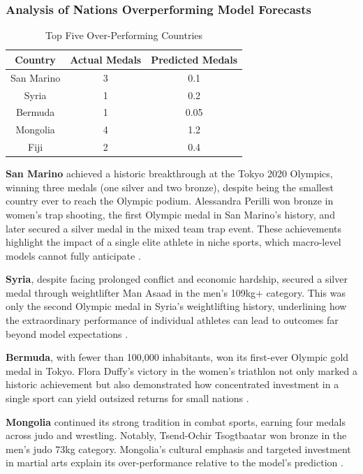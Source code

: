 \documentclass[11pt,twoside]{article}
\numberwithin{Theorem}{section}
\numberwithin{Definition}{section}
\numberwithin{Lemma}{section}
\numberwithin{Algorithm}{section}
\numberwithin{equation}{section}
\begin{document}
\subsubsection{Analysis of Nations Overperforming Model Forecasts}

\begin{table}[H]
\centering
\caption{Top Five Over-Performing Countries}
\label{tab:over}
\begin{tabular}{ccc}
\hline
Country & Actual Medals & Predicted Medals \\
\hline
San Marino & 3 & 0.1 \\
Syria & 1 & 0.2 \\
Bermuda & 1 & 0.05 \\
Mongolia & 4 & 1.2 \\
Fiji & 2 & 0.4 \\
\hline
\end{tabular}
\end{table}

\textbf{San Marino} achieved a historic breakthrough at the Tokyo 2020 Olympics, winning three medals (one silver and two bronze), despite being the smallest country ever to reach the Olympic podium. Alessandra Perilli won bronze in women’s trap shooting, the first Olympic medal in San Marino’s history, and later secured a silver medal in the mixed team trap event. These achievements highlight the impact of a single elite athlete in niche sports, which macro-level models cannot fully anticipate \citep{gasquez2014}.  

\textbf{Syria}, despite facing prolonged conflict and economic hardship, secured a silver medal through weightlifter Man Asaad in the men’s 109kg+ category. This was only the second Olympic medal in Syria’s weightlifting history, underlining how the extraordinary performance of individual athletes can lead to outcomes far beyond model expectations \citep{bernard2004}.  

\textbf{Bermuda}, with fewer than 100,000 inhabitants, won its first-ever Olympic gold medal in Tokyo. Flora Duffy’s victory in the women’s triathlon not only marked a historic achievement but also demonstrated how concentrated investment in a single sport can yield outsized returns for small nations \citep{hoffmann2002}.  

\textbf{Mongolia} continued its strong tradition in combat sports, earning four medals across judo and wrestling. Notably, Tsend-Ochir Tsogtbaatar won bronze in the men’s judo 73kg category. Mongolia’s cultural emphasis and targeted investment in martial arts explain its over-performance relative to the model’s prediction \citep{andreff2015}.  
\end{document}
